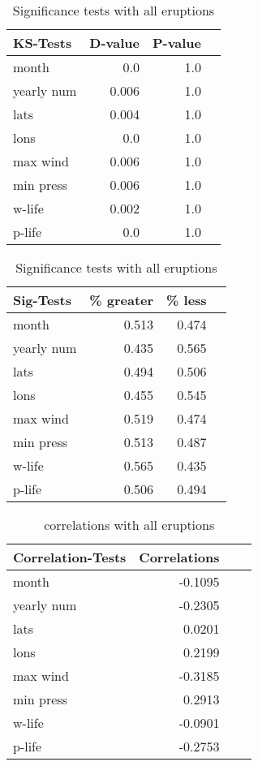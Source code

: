 \documentclass[phd,tocprelim]{cornell}
\begin{document}
\begin{table}[!tbp]
\centering
\begin{minipage}[b]{0.45\textwidth}
\begin{tabular}{lrrr}
\toprule
             KS-Tests &     D-value &      P-value\\
\midrule

month & 0.0 & 1.0 \\
yearly num & 0.006 & 1.0 \\
lats & 0.004 & 1.0 \\
lons & 0.0 & 1.0 \\
max wind & 0.006 & 1.0 \\
min press & 0.006 & 1.0 \\
w-life & 0.002 & 1.0 \\
p-life & 0.0 & 1.0 \\

\bottomrule
\end{tabular}
\caption{KS-tests with all eruptions}
\label{ks:all}
\end{minipage}
\hfill
\begin{minipage}[b]{0.45\textwidth}
\begin{tabular}{lrrr}
\toprule
             Sig-Tests & \% greater &  \% less \\
\midrule

month & 0.513 & 0.474 \\
yearly num & 0.435 & 0.565 \\
lats & 0.494 & 0.506 \\
lons & 0.455 & 0.545 \\
max wind & 0.519 & 0.474 \\
min press & 0.513 & 0.487 \\
w-life & 0.565 & 0.435 \\
p-life & 0.506 & 0.494 \\

\bottomrule
\end{tabular}
\caption{Significance tests with all eruptions}
\label{sig:all}
\end{minipage}
\end{table}

\begin{table}[!tbp]
\centering
\begin{tabular}{lrrr}
\toprule
             Correlation-Tests &     Correlations \\
\midrule

month & -0.1095 \\
yearly num & -0.2305 \\
lats & 0.0201 \\
lons & 0.2199 \\
max wind & -0.3185 \\
min press & 0.2913 \\
w-life & -0.0901 \\
p-life & -0.2753 \\

\bottomrule
\end{tabular}
\caption{correlations with all eruptions}
\label{corr:all}
\end{table}
\end{document}
